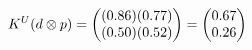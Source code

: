 \documentclass[preview]{standalone}
\begin{document}
\begin{align*}
\special{dvisvgm:raw <g id='unique000'>}K^U(d \otimes p) = \begin{pmatrix} (0.86)(0.77) \\ (0.50)(0.52) \end{pmatrix} = \begin{pmatrix} 0.67 \\ 0.26 \end{pmatrix}\special{dvisvgm:raw </g>}
\end{align*}
\end{document}
